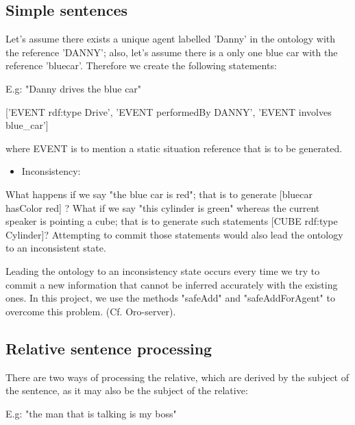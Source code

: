 \documentclass[twoside,a4paper,10pt]{report}
\begin{document}
\subsection{Simple sentences}
\label{83df2a31577b0939e5c2d716b7b579fd}%

Let's assume there exists a unique agent labelled 'Danny' in the ontology with the reference 'DANNY'; also, let's assume there is a only one blue car with the reference 'blue{\textunderscore}car'. Therefore we create the following statements:



\small
\begin{verbatimtab}
  E.g:
  "Danny drives the blue car"
  
  ['EVENT rdf:type Drive',
  'EVENT performedBy DANNY',
  'EVENT involves blue_car']
  
  where EVENT is to mention a static situation reference that is to be generated.
\end{verbatimtab}
\normalsize

\begin{itemize}
    \item  Inconsistency:
\end{itemize}
What happens if we say "the blue car is red"; that is to generate [blue{\textunderscore}car hasColor red] ?
What if we say "this cylinder is green" whereas the current speaker is pointing a cube; that is to generate such statements [CUBE rdf:type Cylinder]?
Attempting to commit those statements would also lead the ontology to an inconsistent state.

Leading the ontology to an inconsistency state occurs every time we try to commit a new information that cannot be inferred accurately with the existing ones.
In this project, we use the methods "safeAdd" and "safeAddForAgent" to overcome this problem. (Cf. Oro-server).


\subsection{Relative sentence processing}
\label{e453b97231b3979c4f8435dc7227a770}%
There are two ways of processing the relative, which are derived by the subject of the sentence, as it may also be the subject of the relative:


\small
\begin{verbatimtab}
  
  E.g: "the man that is talking is my boss"
  
\end{verbatimtab}
\normalsize
\end{document}
